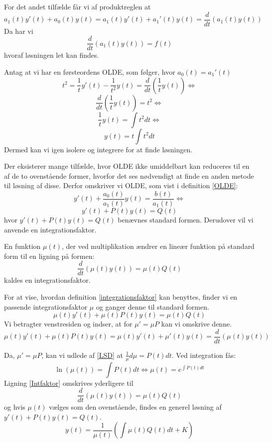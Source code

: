 For det andet tilfælde får vi af produktreglen at $$a_1(t)y'(t) + a_0(t)y(t) = a_1(t)y'(t) + a_1'(t)y(t) = \frac{d}{dt}(a_1(t)y(t))$$Da har vi $$\frac{d}{dt}(a_1(t)y(t)) = f(t)$$ hvoraf løsningen let kan findes.

\begin{Example} \hfill \break
\textnormal{Antag at vi har en førsteordens OLDE, som følger, hvor $a_0(t) = a_1'(t)$} \\
\hfill \break
$$t^2 = \frac{1}{t}y'(t) -\frac{1}{t^2}y(t) = \frac{d}{dt}(\frac{1}{t}y(t))\Leftrightarrow$$
$$\frac{d}{dt}(\frac{1}{t}y(t)) = t^2\Leftrightarrow$$
$$\frac{1}{t}y(t) = \int t^2dt \Leftrightarrow$$ $$ y(t) = t \int t^2dt$$
\hfill \break
\textnormal{Dermed kan vi igen isolere og integrere for at finde løsningen.}
\end{Example}

Der eksisterer mange tilfælde, hvor OLDE ikke umiddelbart kan reduceres til en af de to ovenstående former, hvorfor det ses nødvendigt at finde en anden metode til løsning af disse. Derfor omskriver vi OLDE, som vist i definition \ref{OLDE}: $${y'(t) + \frac{a_0(t)}{a_1(t)}y(t) = \frac{b(t)}{a_1(t)}} \Leftrightarrow$$
$$y'(t) + P(t)y(t) = Q(t)$$ hvor $y'(t) + P(t)y(t) = Q(t)$ benævnes standard formen. Derudover vil vi anvende en integrationsfaktor.

\begin{definition}[Integrationsfaktor]
\label{integrationsfaktor}
En funktion $\mu (t)$, der ved multiplikation ændrer en lineær funktion på standard form til en ligning på formen: $$\frac{d}{dt}(\mu (t)y(t)) = \mu (t)Q(t)$$ kaldes en integrationsfaktor.
\end{definition}

For at vise, hvordan definition \ref{integrationsfaktor} kan benyttes, finder vi en passende integrationsfaktor $\mu$ og ganger denne til standard formen.
\begin{equation}\label{Intfaktor}
\mu (t)y'(t) + \mu (t)P(t)y(t) = \mu (t)Q(t) 
\end{equation}
Vi betragter venstresiden og indser, at for $\mu ' = \mu P$ kan vi omskrive denne.
$$\mu (t)y'(t) + \mu (t)P(t)y(t) = \mu (t)y'(t) + \mu '(t)y(t) = \frac{d}{dt}(\mu (t)y(t))$$

Da, $\mu ' = \mu P$, kan vi udlede af \eqref{LSD} at $\frac{1}{\mu}d\mu = P(t)dt$. Ved integration fås: $$\ln(\mu (t))=\int P(t)dt\Leftrightarrow \mu (t) = e^{\int P(t)dt}$$ Ligning \eqref{Intfaktor} omskrives yderligere til $$\frac{d}{dt}(\mu (t)y(t)) = \mu (t)Q(t)$$ og hvis $\mu (t)$ vælges som den ovenstående, findes en generel løsning af $y'(t) + P(t)y(t) = Q(t)$.
\begin{equation}
y(t)=\frac{1}{\mu (t)}(\int \mu (t)Q(t)dt+K)
\end{equation}

